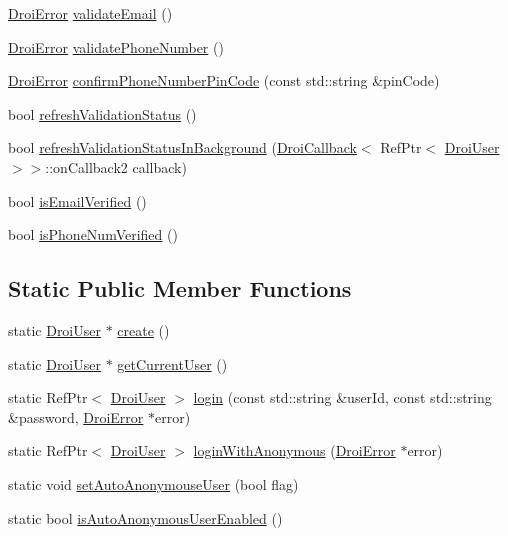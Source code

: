 \begin{DoxyCompactItemize}
\item 
\hyperlink{class_droi_error}{Droi\+Error} \hyperlink{class_droi_user_a1c908092717de36c51b0561546fc76b1}{validate\+Email} ()
\item 
\hyperlink{class_droi_error}{Droi\+Error} \hyperlink{class_droi_user_a771f0ed19004d3565fdc6b7663d0a566}{validate\+Phone\+Number} ()
\item 
\hyperlink{class_droi_error}{Droi\+Error} \hyperlink{class_droi_user_a4a76d7e4ab2865f6ba2e01470091dca8}{confirm\+Phone\+Number\+Pin\+Code} (const std\+::string \&pin\+Code)
\item 
bool \hyperlink{class_droi_user_ae0b35cc0d9e35a415ce203d909857861}{refresh\+Validation\+Status} ()
\item 
bool \hyperlink{class_droi_user_a54b508fdf1684d5f143b7fa1884dc03c}{refresh\+Validation\+Status\+In\+Background} (\hyperlink{struct_droi_callback}{Droi\+Callback}$<$ Ref\+Ptr$<$ \hyperlink{class_droi_user}{Droi\+User} $>$$>$\+::on\+Callback2 callback)
\item 
bool \hyperlink{class_droi_user_aa45e722831198f051f635f8d9abe8da3}{is\+Email\+Verified} ()
\item 
bool \hyperlink{class_droi_user_a0d62ee68696b5e09200fcd4f8826bcb0}{is\+Phone\+Num\+Verified} ()
\end{DoxyCompactItemize}
\subsection*{Static Public Member Functions}
\begin{DoxyCompactItemize}
\item 
static \hyperlink{class_droi_user}{Droi\+User} $\ast$ \hyperlink{class_droi_user_a74b3c07a144ae1c916c4d3636c5a4959}{create} ()
\item 
static \hyperlink{class_droi_user}{Droi\+User} $\ast$ \hyperlink{class_droi_user_a43acc04ec54f82a3bf2c0ea013245f82}{get\+Current\+User} ()
\item 
static Ref\+Ptr$<$ \hyperlink{class_droi_user}{Droi\+User} $>$ \hyperlink{class_droi_user_a673787980cbb072df89cdf72239e7984}{login} (const std\+::string \&user\+Id, const std\+::string \&password, \hyperlink{class_droi_error}{Droi\+Error} $\ast$error)
\item 
static Ref\+Ptr$<$ \hyperlink{class_droi_user}{Droi\+User} $>$ \hyperlink{class_droi_user_a27da664e147073967fc9e59b31ca15cb}{login\+With\+Anonymous} (\hyperlink{class_droi_error}{Droi\+Error} $\ast$error)
\item 
static void \hyperlink{class_droi_user_acf4f563aca5705d83ede8fcaf2277c39}{set\+Auto\+Anonymouse\+User} (bool flag)
\item 
static bool \hyperlink{class_droi_user_a35e4e2e972597cfc491ce2d7ee758488}{is\+Auto\+Anonymous\+User\+Enabled} ()
\end{DoxyCompactItemize}
